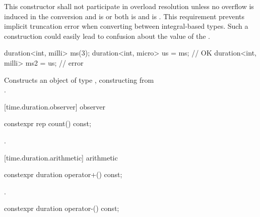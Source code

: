 \begin{itemdescr}
\pnum
\remarks This constructor shall not participate in overload resolution unless
no overflow is induced in the conversion and
 is  or both
 is  and
 is . \enternote This
requirement prevents implicit truncation error when converting between
integral-based  types. Such a construction could easily lead to
confusion about the value of the . \exitnote
\enterexample
\begin{codeblock}
duration<int, milli> ms(3);
duration<int, micro> us = ms;       // OK
duration<int, milli> ms2 = us;      // error
\end{codeblock}
\exitexample

\pnum
\effects Constructs an object of type , constructing  from\\
.
\end{itemdescr}

[time.duration.observer]{ observer}

%
%
\begin{itemdecl}
constexpr rep count() const;
\end{itemdecl}

\begin{itemdescr}
\pnum
\returns {}.
\end{itemdescr}

[time.duration.arithmetic]{ arithmetic}

%
%
\begin{itemdecl}
constexpr duration operator+() const;
\end{itemdecl}

\begin{itemdescr}
\pnum
\returns {}.
\end{itemdescr}

%
%
\begin{itemdecl}
constexpr duration operator-() const;
\end{itemdecl}

